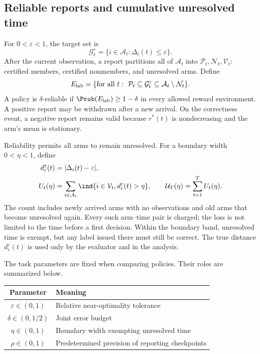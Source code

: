 \documentclass[11pt]{article}
\begin{document}
\subsection{Reliable reports and cumulative unresolved time}
\label{sec:reporting_task}

For $0<\varepsilon<1$, the target set is
\[
 \mathcal G_t^\varepsilon=\{i\in\mathcal A_t:\Delta_i(t)\le\varepsilon\}.
\]
After the current observation, a report partitions all of $\mathcal A_t$
into $\mathcal P_t,\mathcal N_t,\mathcal V_t$: certified members, certified
nonmembers, and unresolved arms. Define
\[
 E_{\rm lab}=\{\text{for all }t:\ \mathcal P_t\subseteq\mathcal G_t^\varepsilon
                  \subseteq\mathcal A_t\setminus\mathcal N_t\}.
\]
A policy is $\delta$-reliable if $\Prob(E_{\rm lab})\ge1-\delta$ in every
allowed reward environment. A positive report may be withdrawn after a new
arrival. On the correctness event, a negative report remains valid because
$r^*(t)$ is nondecreasing and the arm's mean is stationary.

Reliability permits all arms to remain unresolved. For a boundary width
$0<\eta<1$, define
\begin{equation}
 \begin{split}
 d_i^\varepsilon(t)&=|\Delta_i(t)-\varepsilon|,\\
 U_t(\eta)&=\sum_{i\in\mathcal A_t}
   \ind\{i\in\mathcal V_t,d_i^\varepsilon(t)>\eta\},\qquad
 \mathcal U_T(\eta)=\sum_{t=1}^{T}U_t(\eta).
 \end{split}
 \label{eq:area}
\end{equation}
The count includes newly arrived arms with no observations and old arms
that become unresolved again. Every such arm--time pair is charged; the
loss is not limited to the time before a first decision. Within the
boundary band, unresolved time is exempt, but any label issued there must
still be correct. The true distance $d_i^\varepsilon(t)$ is used only by
the evaluator and in the analysis.

The task parameters are fixed when comparing policies. Their roles are
summarized below.
\begin{center}
\begin{tabular}{cl}
\toprule
Parameter & Meaning\\
\midrule
$\varepsilon\in(0,1)$ & Relative near-optimality tolerance\\
$\delta\in(0,1/2)$ & Joint error budget\\
$\eta\in(0,1)$ & Boundary width exempting unresolved time\\
$\rho\in(0,1)$ & Predetermined precision of reporting checkpoints\\
\bottomrule
\end{tabular}
\end{center}
\end{document}
